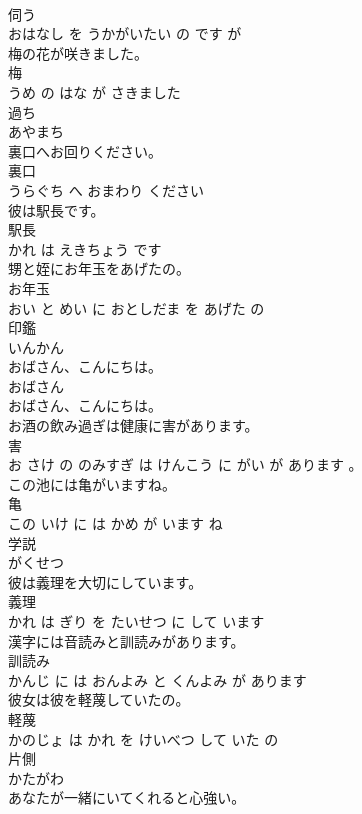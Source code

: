 \documentclass[8pt]{extreport}
\begin{document}
\begin{CJK}{UTF8}{min}
\\	伺う 
\\	おはなし を うかがいたい の です が			
\\	梅の花が咲きました。	
\\	梅 
\\	うめ の はな が さきました			
\\	過ち	
\\	あやまち		
\\	裏口へお回りください。	
\\	裏口 
\\	うらぐち へ おまわり ください			
\\	彼は駅長です。	
\\	駅長 
\\	かれ は えきちょう です			
\\	甥と姪にお年玉をあげたの。	
\\	お年玉 
\\	おい と めい に おとしだま を あげた の			
\\	印鑑	
\\	いんかん		
\\	おばさん、こんにちは。	
\\	おばさん 
\\	おばさん、こんにちは。			
\\	お酒の飲み過ぎは健康に害があります。	
\\	害 
\\	お さけ の のみすぎ は けんこう に がい が あります 。			
\\	この池には亀がいますね。	
\\	亀 
\\	この いけ に は かめ が います ね			
\\	学説	
\\	がくせつ		
\\	彼は義理を大切にしています。	
\\	義理 
\\	かれ は ぎり を たいせつ に して います			
\\	漢字には音読みと訓読みがあります。	
\\	訓読み 
\\	かんじ に は おんよみ と くんよみ が あります			
\\	彼女は彼を軽蔑していたの。	
\\	軽蔑 
\\	かのじょ は かれ を けいべつ して いた の			
\\	片側	
\\	かたがわ		
\\	あなたが一緒にいてくれると心強い。	

\end{CJK}
\end{document}
